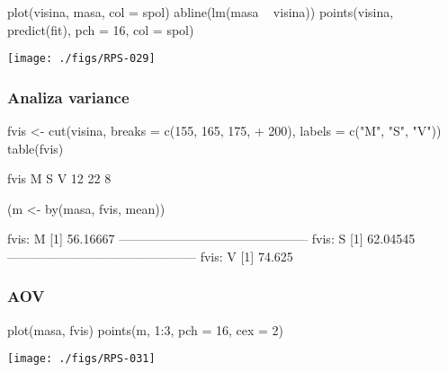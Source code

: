 \begin{frame}[fragile]
\frametitle{}
\begin{Schunk}
\begin{Sinput}
  plot(visina, masa, col = spol)
  abline(lm(masa ~ visina))
  points(visina, predict(fit), pch = 16, col = spol)
\end{Sinput}
\end{Schunk}
\texttt{[image: ./figs/RPS-029]}
\end{frame}

\begin{frame}[fragile]
\frametitle{Analiza variance}
\begin{Schunk}
\begin{Sinput}
  fvis <- cut(visina, breaks = c(155, 165, 175, 
+     200), labels = c("M", "S", "V"))
  table(fvis)
\end{Sinput}
\begin{Soutput}
fvis
 M  S  V 
12 22  8 
\end{Soutput}
\begin{Sinput}
  (m <- by(masa, fvis, mean))
\end{Sinput}
\begin{Soutput}
fvis: M
[1] 56.16667
--------------------------------------------- 
fvis: S
[1] 62.04545
--------------------------------------------- 
fvis: V
[1] 74.625
\end{Soutput}
\end{Schunk}
\end{frame}

\begin{frame}[fragile]
\frametitle{AOV}
\begin{Schunk}
\begin{Sinput}
  plot(masa, fvis)
  points(m, 1:3, pch = 16, cex = 2)
\end{Sinput}
\end{Schunk}
\texttt{[image: ./figs/RPS-031]}
\end{frame}

